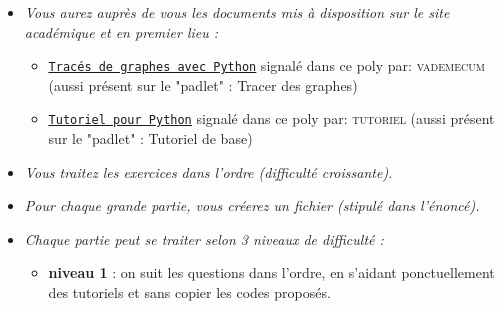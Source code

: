 \documentclass[11pt]{article}
\begin{document}
\begin{itemize}
\bigskip






\item \textit{Vous aurez auprès de vous les documents mis à disposition sur le site académique et en premier lieu : }

\medskip


\begin{itemize}
 \item \href{http://pedagogie.ac-limoges.fr/physique-chimie/IMG/pdf/python-trace_de_graphe.pdf}{\underline{\texttt{Tracés de graphes avec Python}}} signalé dans ce poly par: \textsc{vademecum} (aussi présent sur le "padlet" : Tracer des graphes)

 \medskip
 
 \item \href{http://pedagogie.ac-limoges.fr/physique-chimie/IMG/pdf/python-tutoriel.pdf}{\underline{\texttt{Tutoriel pour Python}}} signalé dans ce poly par: \textsc{tutoriel} (aussi présent sur le "padlet" : Tutoriel de base)
\end{itemize}







\bigskip



\item \textit{Vous traitez les exercices dans l'ordre (difficulté croissante).}




\bigskip






\item \textit{Pour chaque grande partie, vous créerez un fichier (stipulé dans l'énoncé).}







\bigskip






\item \textit{Chaque partie peut se traiter selon 3 niveaux de difficulté :} 

\medskip

\begin{itemize}
 \item \textbf{niveau 1} : on suit les questions dans l'ordre, en s'aidant ponctuellement des tutoriels et sans copier les codes proposés.


\end{itemize}
\end{itemize}
\end{document}
